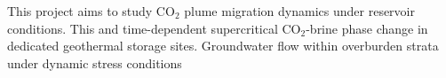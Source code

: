 \documentclass[12pts,a4paper,amsmath,amssymb,floatfix]{article}%
\newcommand{\CO}{CO\ensuremath{_{2}}}
\begin{document}
This project aims to study \CO\; plume migration dynamics under reservoir conditions. This and time-dependent supercritical \CO-brine phase change in dedicated geothermal storage sites.
Groundwater flow within overburden strata under dynamic stress conditions




\begin{comment}
This proposal comes at a time when the UK nuclear sector is resurgent. It is now widely accepted that one of the ways in which the UK can meet its commitments to reducing CO2 emissions, as well as dealing with its over-reliance on imported fuel supplies, is to replace the current fleet of ageing nuclear reactors. 

Natural and industrial porous media is key to a wide variety of traditional and emerging engineering applications, including but not limited to oil and gas extraction from geological reservoirs, carbon capture and storage, geothermal reservoir engineering, soil sciences, groundwater remediation and protection, biological engineering, food processing, fuel cells, nano-technology, construction engineering, wood processing and printing. 


\end{comment}
\end{document}

